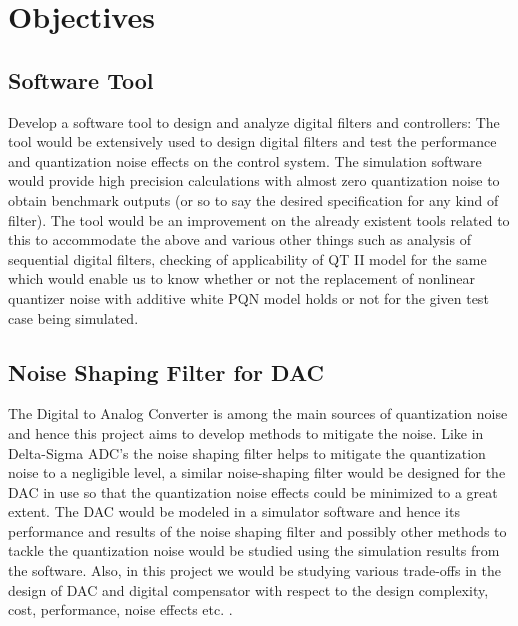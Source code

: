 \documentclass[colorlinks=true,pdfstartview=FitV,linkcolor=blue,
            citecolor=red,urlcolor=magenta]{ligodoc}
\begin{document}
\section{Objectives}
\subsection{Software Tool}
Develop a software tool to design and analyze digital filters and controllers: The tool would be extensively used to design digital filters and test the performance and quantization noise effects on the control system. The simulation software would provide high precision calculations with almost zero quantization noise to obtain benchmark outputs (or so to say the desired specification for any kind of filter). The tool would be an improvement on the already existent tools related to this to accommodate the above and various other things such as analysis of sequential digital filters, checking of applicability of QT II model for the same which would enable us to know whether or not the replacement of nonlinear quantizer noise with additive  white PQN model holds or not for the given test case being simulated.
\subsection{Noise Shaping Filter for DAC}
The Digital to Analog Converter is among the main sources of quantization noise and hence this project aims to develop methods to mitigate the noise. Like in Delta-Sigma ADC’s the noise shaping filter helps to mitigate the quantization noise to a negligible level, a similar noise-shaping filter would be designed for the DAC in use so that the quantization noise effects could be minimized to a great extent. The DAC would be modeled in a simulator software and hence its performance and results of the noise shaping filter and possibly other methods to tackle the quantization noise would be studied using the simulation results from the software.  Also, in this project we would be studying various trade-offs in the design of DAC and digital compensator with respect to the design complexity, cost, performance, noise effects etc. . 
\end{document}
